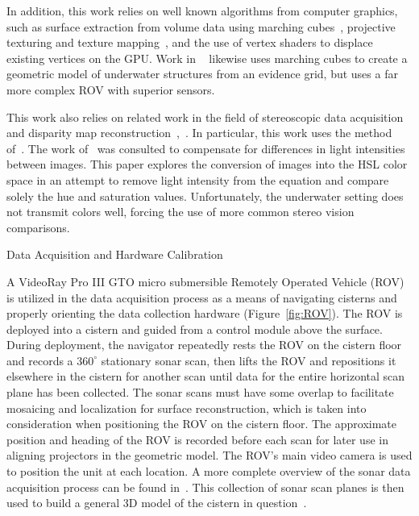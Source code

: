 \documentclass[twocolumn]{article}
\makeatletter
\def\section{\@startsection{section}{1}{\z@}{24pt plus 2 pt
minus 2 pt} {12pt plus 2pt minus 2pt}{\large\bf}}
\makeatother
\begin{document}
In addition, this work relies on well known algorithms from computer graphics, such as surface extraction from volume data using marching cubes~\cite{Lorensen}, projective texturing and texture mapping~\cite{Williams78castingcurved,Segal}, and the use of vertex shaders to displace existing vertices on the GPU. Work in ~\cite{Fairfield:2010} likewise uses marching cubes to create a geometric model of underwater structures from an evidence grid, but uses a far more complex ROV with superior sensors.

This work also relies on related work in the field of stereoscopic data acquisition and disparity map reconstruction~\cite{stereo:gutMarroquin},~\cite{stereo:scharsteinSzeliski}.
In particular, this work uses the method of~\cite{stereo:zitKan}.
The work of~\cite{stereo:nalGast} was consulted to compensate for differences in light intensities between images.
This paper explores the conversion of images into the HSL color space in an attempt to remove light intensity from the equation and compare solely the hue and saturation values.
Unfortunately, the underwater setting does not transmit colors well, forcing the use of more common stereo vision comparisons. 

\section{Data Acquisition and Hardware Calibration}
\label{sec:data}

A VideoRay Pro III GTO micro submersible Remotely Operated Vehicle (ROV) is utilized in the data acquisition process as a means of navigating cisterns and properly orienting the data collection hardware (Figure~\ref{fig:ROV}). The ROV is deployed into a cistern and guided from a control module above the surface. During deployment, the navigator repeatedly rests the ROV on the cistern floor and records a $360^{\circ}$ stationary sonar scan, then lifts the ROV and repositions it elsewhere in the cistern for another scan until data for the entire horizontal scan plane has been collected. The sonar scans must have some overlap to facilitate mosaicing and localization for surface reconstruction, which is taken into consideration when positioning the ROV on the cistern floor. The approximate position and heading of the ROV is recorded before each scan for later use in aligning projectors in the geometric model. The ROV's main video camera is used to position the unit at each location. A more complete overview of the sonar data acquisition process can be found in~\cite{ClarkVast}. This collection of sonar scan planes is then used to build a general 3D model of the cistern in question~\cite{ICEX11}.
\end{document}
